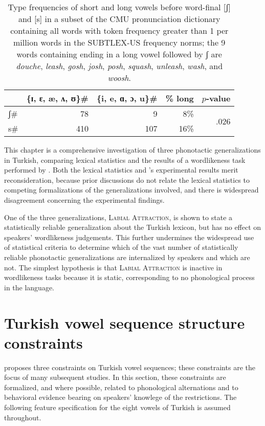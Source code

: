 \begin{table}[ht]
\centering
\begin{tabular}{l r r r r}
\toprule
          & \{ɪ, ɛ, æ, ʌ, ʊ\}\gap{}\# & \{i, e, ɑ, ɔ, u\}\gap{}\# & \% long & $p$-value \\
\midrule
\gap{}ʃ\# & 78                & 9                 & 8\%      & \multirow{2}{*}{.026} \\
\gap{}s\# & 410               & 107               & 16\%     & \\
\bottomrule
\end{tabular}
\caption{Type frequencies of short and long vowels before word-final [ʃ] and [s] in a subset of the CMU pronunciation dictionary containing all words with token frequency greater than 1 per million words in the SUBTLEX-US frequency norms; the 9 words containing ending in a long vowel followed by ʃ are \emph{douche}, \emph{leash}, \emph{gosh}, \emph{josh}, \emph{posh}, \emph{squash}, \emph{unleash}, \emph{wash}, and \emph{woosh}.}
\label{ssh}
\end{table}

This chapter is a comprehensive investigation of three phonotactic generalizations in Turkish, comparing lexical statistics and the results of a wordlikeness task performed by \citet{Zimmer1969}. Both the lexical statistics and \citeauthor{Zimmer1969}'s experimental results merit reconsideration, because prior discussions do not relate the lexical statistics to competing formalizations of the generalizations involved, and there is widespread disagreement concerning the experimental findings.

One of the three generalizations, \textsc{Labial Attraction}, is shown to   state a statistically reliable generalization about the Turkish lexicon, but has no effect on speakers' wordlikeness judgements. This further undermines the widespread use of statistical criteria to determine which of the vast number of statistically reliable phonotactic generalizations are internalized by speakers and which are not. The simplest hypothesis is that \textsc{Labial Attraction} is inactive in wordlikeness tasks because it is static, corresponding to no phonological process in the language.

\section{Turkish vowel sequence structure constraints}

\citet{Lees1966b,Lees1966a} proposes three constraints on Turkish vowel sequences; these constraints are the focus of many subsequent studies. In this section, these constraints are formalized, and where possible, related to phonological alternations and to behavioral evidence bearing on speakers' knowlege of the restrictions. The following feature specification for the eight vowels of Turkish is assumed throughout.

